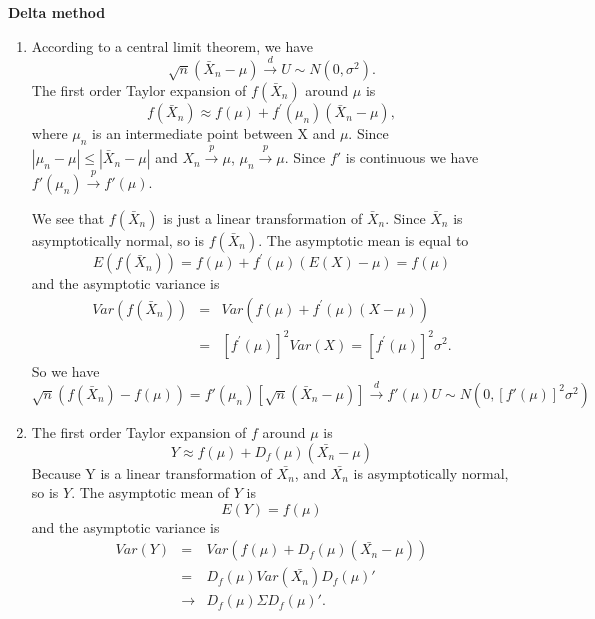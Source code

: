 \documentclass{article}
\begin{document}
\begin{solution}
\textbf{Delta method}

\begin{enumerate}
  \item According to a central limit theorem, we have
  $$\sqrt{n}\left(\bar{X}_n-\mu\right) \overset{d}{\rightarrow} U \sim N(0,\sigma^2).$$ The first order Taylor expansion of $f(\bar{X}_n)$ around $\mu $ is%
\begin{equation*}
f\left( \bar{X}_n \right) \approx f\left( \mu \right) +f^{\prime }\left( \mu_n  \right) \left(
\bar{X}_n-\mu \right),
\end{equation*}
where $\mu_n$ is an intermediate point between X and $\mu$. Since $|\mu_n-\mu|\leq |\bar{X}_n-\mu|$ and $X_n \overset{p}{\rightarrow} \mu$, $\mu_n \overset{p}{\rightarrow}\mu$. Since $f'$ is continuous we have $f'(\mu_n) \overset{p}{\rightarrow} f'(\mu)$.

We see that $f(\bar{X}_n)$ is just a linear transformation of $\bar{X}_n$. Since $\bar{X}_n$ is asymptotically normal, so is $f(\bar{X}_n)$. The asymptotic mean is equal to
\begin{equation*}
E\left( f(\bar{X}_n)\right) = f\left( \mu \right) +f^{\prime }\left( \mu
\right) \left( E\left(X\right)-\mu \right) = f\left( \mu \right)
\end{equation*}%
and the asymptotic variance is%
\begin{eqnarray*}
Var\left( f(\bar{X}_n)\right) &=&Var\left( f\left( \mu \right) +f^{\prime }\left(
\mu \right) \left( X-\mu \right) \right) \\
&=&\left[ f^{\prime }\left( \mu \right) \right] ^{2}Var\left( X\right)= \left[ f^{\prime }\left( \mu \right) \right] ^{2}\sigma ^{2}.
\end{eqnarray*}
So we have
$$\sqrt{n}\left(f(\bar{X}_n)-f(\mu)\right)=f'(\mu_n)\left[\sqrt{n}\left(\bar{X}_n-\mu\right)\right] \overset{d}{\rightarrow} f'(\mu)U \sim N(0,[f'(\mu)]^2\sigma^2)$$
\item The first order Taylor expansion of $f$ around $\mu $ is%
\begin{equation*}
Y \approx f\left( \mu \right) +D_f\left( \mu \right) \left(
\bar{X_n}-\mu \right)
\end{equation*}
Because Y is a linear transformation of $\bar{X_n}$, and $\bar{X_n}$ is asymptotically normal, so is $Y$. The asymptotic mean of $Y$ is%
\begin{equation*}
E\left( Y\right) = f\left( \mu \right)
\end{equation*}%
and the asymptotic variance is%
\begin{eqnarray*}
Var\left( Y\right) &=&Var\left( f\left( \mu \right) +D_f\left(\mu\right) \left( \bar{X_n}-\mu \right) \right) \\
&=&D_f\left( \mu \right) Var\left( \bar{X_n}\right)D_f\left( \mu \right)' \\
&\rightarrow & D_f\left( \mu \right)\Sigma D_f\left( \mu \right)'.
\end{eqnarray*}
\end{enumerate}

\end{solution}
\end{document}
